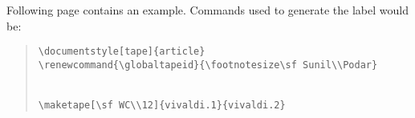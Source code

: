 Following page contains an example. Commands used to generate the label would
be:
\leftmargini 25pt
\begin{quote}
\begin{verbatim}
\documentstyle[tape]{article}
\renewcommand{\globaltapeid}{\footnotesize\sf Sunil\\Podar}


\maketape[\sf WC\\12]{vivaldi.1}{vivaldi.2}

\end{verbatim}
\end{quote}

\newpage
\vspace*{-4mm}
{%


\renewcommand{\globaltapeid}{\footnotesize\sf Sunil\\Podar}
\begin{center}
\small
{}
\end{center}%
}

\renewcommand{\baselinestretch}{0.85}
\small\normalsize

